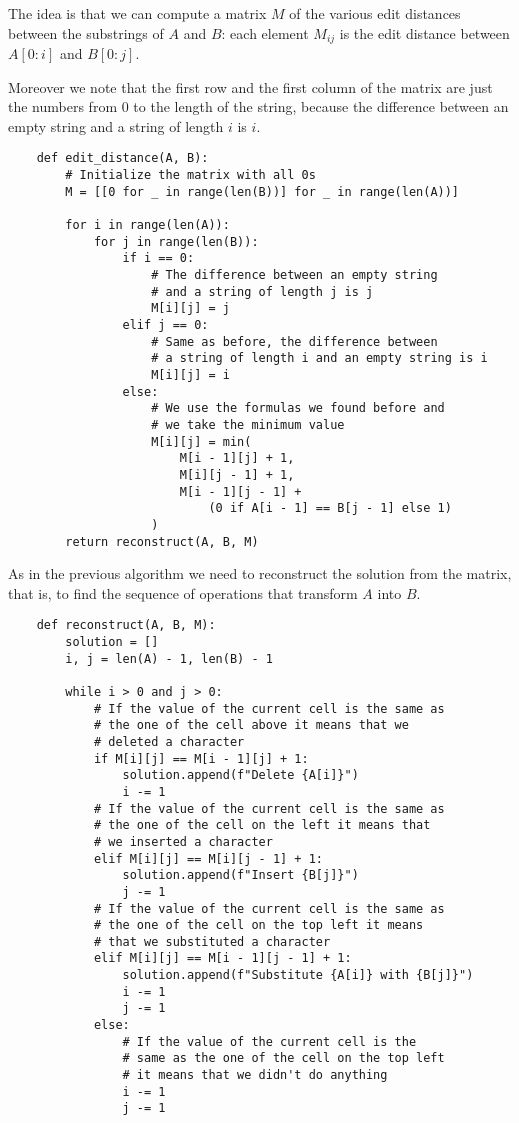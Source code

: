 \documentclass[12pt]{extarticle}
\begin{document}
The idea is that we can compute a matrix $M$ of the various edit distances between the substrings of $A$ and $B$: each element $M_{ij}$ is the edit distance between $A[0:i]$ and $B[0:j]$.

Moreover we note that the first row and the first column of the matrix are just the numbers from 0 to the length of the string, because the difference between an empty string and a string of length $i$ is $i$.

\begin{verbatim}
    def edit_distance(A, B):
        # Initialize the matrix with all 0s
        M = [[0 for _ in range(len(B))] for _ in range(len(A))]

        for i in range(len(A)):
            for j in range(len(B)):
                if i == 0:
                    # The difference between an empty string
                    # and a string of length j is j
                    M[i][j] = j
                elif j == 0:
                    # Same as before, the difference between
                    # a string of length i and an empty string is i
                    M[i][j] = i
                else:
                    # We use the formulas we found before and
                    # we take the minimum value
                    M[i][j] = min(
                        M[i - 1][j] + 1,
                        M[i][j - 1] + 1,
                        M[i - 1][j - 1] +
                            (0 if A[i - 1] == B[j - 1] else 1)
                    )
        return reconstruct(A, B, M)
\end{verbatim}

As in the previous algorithm we need to reconstruct the solution from the matrix, that is, to find the sequence of operations that transform $A$ into $B$.

\begin{verbatim}
    def reconstruct(A, B, M):
        solution = []
        i, j = len(A) - 1, len(B) - 1

        while i > 0 and j > 0:
            # If the value of the current cell is the same as 
            # the one of the cell above it means that we 
            # deleted a character
            if M[i][j] == M[i - 1][j] + 1:
                solution.append(f"Delete {A[i]}")
                i -= 1
            # If the value of the current cell is the same as 
            # the one of the cell on the left it means that
            # we inserted a character
            elif M[i][j] == M[i][j - 1] + 1:
                solution.append(f"Insert {B[j]}")
                j -= 1
            # If the value of the current cell is the same as
            # the one of the cell on the top left it means 
            # that we substituted a character
            elif M[i][j] == M[i - 1][j - 1] + 1:
                solution.append(f"Substitute {A[i]} with {B[j]}")
                i -= 1
                j -= 1
            else:
                # If the value of the current cell is the 
                # same as the one of the cell on the top left
                # it means that we didn't do anything
                i -= 1
                j -= 1

\end{verbatim}
\end{document}
